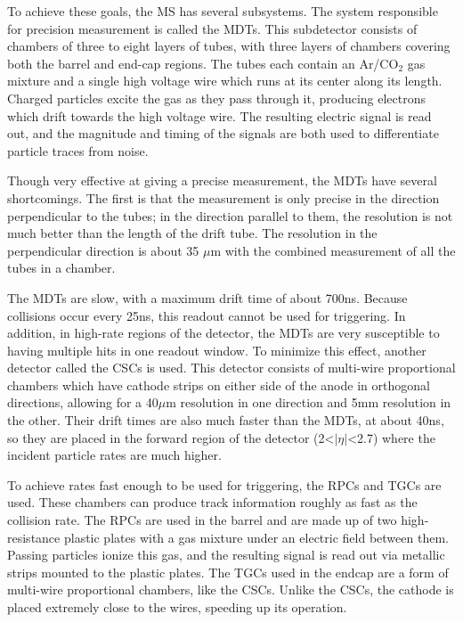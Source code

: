 To achieve these goals, the \ac{MS} has several subsystems. The system responsible for precision measurement is called the \acp{MDT}. This subdetector consists of chambers of three to eight layers of tubes, with three layers of chambers covering both the barrel and end-cap regions. The tubes each contain an Ar/CO$_2$ gas mixture and a single high voltage wire which runs at its center along its length. Charged particles excite the gas as they pass through it, producing electrons which drift towards the high voltage wire. The resulting electric signal is read out, and the magnitude and timing of the signals are both used to differentiate particle traces from noise. 

Though very effective at giving a precise measurement, the \acp{MDT} have several shortcomings. The first is that the measurement is only precise in the direction perpendicular to the tubes; in the direction parallel to them, the resolution is not much better than the length of the drift tube. The resolution in the perpendicular direction is about 35 $\mu$m with the combined measurement of all the tubes in a chamber. 

The \acp{MDT} are slow, with a maximum drift time of about 700ns. Because collisions occur every 25ns, this readout cannot be used for triggering. In addition, in high-rate regions of the detector, the \acp{MDT} are very susceptible to having multiple hits in one readout window. To minimize this effect, another detector called the \acp{CSC} is used. This detector consists of multi-wire proportional chambers which have cathode strips on either side of the anode in orthogonal directions, allowing for a 40$\mu$m resolution in one direction and 5mm resolution in the other. Their drift times are also much faster than the \acp{MDT}, at about 40ns, so they are placed in the forward region of the detector (2<$|\eta|$<2.7) where the incident particle rates are much higher. 

To achieve rates fast enough to be used for triggering, the \acp{RPC} and \acp{TGC} are used. These chambers can produce track information roughly as fast as the collision rate. The \acp{RPC} are used in the barrel and are made up of two high-resistance plastic plates with a gas mixture under an electric field between them. Passing particles ionize this gas, and the resulting signal is read out via metallic strips mounted to the plastic plates. The \acp{TGC} used in the endcap are a form of multi-wire proportional chambers, like the \acp{CSC}. Unlike the \acp{CSC}, the cathode is placed extremely close to the wires, speeding up its operation. 

